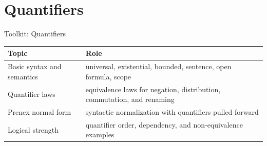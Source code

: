 
\section{Quantifiers}

\begin{toolkitbox}{Toolkit: Quantifiers}
\small
\begin{tabular}{l l}
\toprule
\textbf{Topic} & \textbf{Role} \\
\midrule
Basic syntax and semantics & universal, existential, bounded, sentence, open formula, scope \\
Quantifier laws & equivalence laws for negation, distribution, commutation, and renaming \\
Prenex normal form & syntactic normalization with quantifiers pulled forward \\
Logical strength & quantifier order, dependency, and non-equivalence examples \\
\bottomrule
\end{tabular}
\end{toolkitbox}







